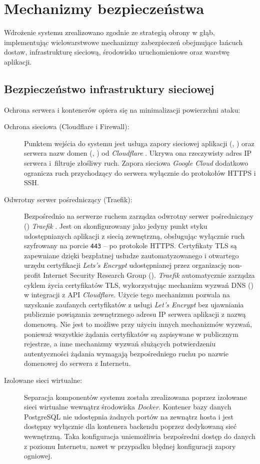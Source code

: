 \section{Mechanizmy bezpieczeństwa}

Wdrożenie systemu zrealizowano zgodnie ze strategią obrony w głąb, implementując wielowarstwowe mechanizmy zabezpieczeń obejmujące łańcuch dostaw, infrastrukturę sieciową, środowisko uruchomieniowe oraz warstwę aplikacji.

\subsection{Bezpieczeństwo infrastruktury sieciowej} \label{sec:net-inf-sec}

Ochrona serwera i kontenerów opiera się na minimalizacji powierzchni ataku:

\begin{description}
	\item[Ochrona sieciowa (Cloudflare i Firewall):] Punktem wejścia do systemu jest usługa zapory sieciowej aplikacji (, ) oraz serwera nazw domen (, ) od \textit{Cloudflare} \cite{cloudflare}. Ukrywa ona rzeczywisty adres IP serwera i~filtruje złośliwy ruch. Zapora sieciowa \textit{Google Cloud} dodatkowo ogranicza ruch przychodzący do serwera wyłącznie do protokołów HTTPS i SSH.
	\item[Odwrotny serwer pośredniczący (Traefik):] Bezpośrednio na serwerze ruchem zarządza odwrotny serwer pośredniczący () \textit{Traefik} \cite{traefik}. Jest on skonfigurowany jako jedyny punkt styku udostępnianych aplikacji z siecią zewnętrzną, obsługując wyłącznie ruch szyfrowany na porcie \texttt{443} -- po protokole HTTPS. Certyfikaty TLS są zapewniane dzięki bezpłatnej usłudze zautomatyzowanego i otwartego urzędu certyfikacji \textit{Lets's Encrypt} \cite{letsencrypt} udostępnianej przez organizację non-profit Internet Security Research Group (). \textit{Traefik} automatycznie zarządza cyklem życia certyfikatów TLS, wykorzystując mechanizm wyzwań DNS () w integracji z API \textit{Cloudflare}. Użycie tego mechanizmu pozwala na uzyskanie zaufanych certyfikatów z usługi \textit{Let's Encrypt} bez ujawniania publicznie powiązania zewnętrznego adresu IP serwera aplikacji z nazwą domenową. Nie jest to możliwe przy użyciu innych mechanizmów wyzwań, ponieważ wszystkie żądania certyfikatów są zapisywane w publicznym rejestrze, a inne mechanizmy wyzwań służących potwierdzeniu autentyczności żądania wymagają bezpośredniego ruchu po nazwie domenowej do serwera z Internetu.
	\item[Izolowane sieci wirtualne:]  Separacja komponentów systemu została zrealizowana poprzez izolowane sieci wirtualne wewnątrz środowiska \textit{Docker}. Kontener bazy danych PostgreSQL nie udostępnia żadnych portów na zewnątrz hosta i jest dostępny wyłącznie dla kontenera backendu poprzez dedykowaną sieć wewnętrzną. Taka konfiguracja uniemożliwia bezpośredni dostęp do danych z poziomu Internetu, nawet w przypadku błędnej konfiguracji zapory ogniowej.
\end{description}

